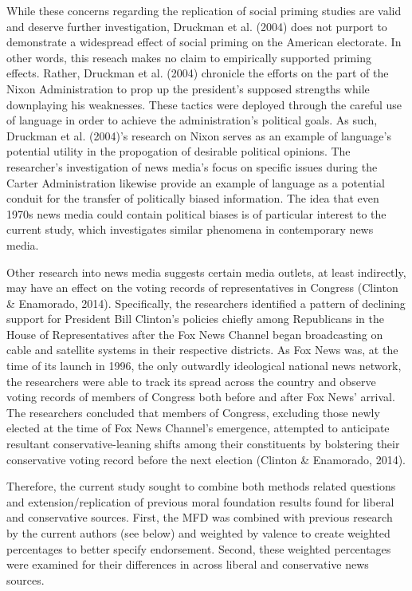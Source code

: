 \documentclass[english,,man]{apa6}
\begin{document}
While these concerns regarding the replication of social priming studies are valid and deserve further investigation, Druckman et al. (2004) does not purport to demonstrate a widespread effect of social priming on the American electorate. In other words, this reseach makes no claim to empirically supported priming effects. Rather, Druckman et al. (2004) chronicle the efforts on the part of the Nixon Administration to prop up the president's supposed strengths while downplaying his weaknesses. These tactics were deployed through the careful use of language in order to achieve the administration's political goals. As such, Druckman et al. (2004)'s research on Nixon serves as an example of language's potential utility in the propogation of desirable political opinions. The researcher's investigation of news media's focus on specific issues during the Carter Administration likewise provide an example of language as a potential conduit for the transfer of politically biased information. The idea that even 1970s news media could contain political biases is of particular interest to the current study, which investigates similar phenomena in contemporary news media.

Other research into news media suggests certain media outlets, at least indirectly, may have an effect on the voting records of representatives in Congress (Clinton \& Enamorado, 2014). Specifically, the researchers identified a pattern of declining support for President Bill Clinton's policies chiefly among Republicans in the House of Representatives after the Fox News Channel began broadcasting on cable and satellite systems in their respective districts. As Fox News was, at the time of its launch in 1996, the only outwardly ideological national news network, the researchers were able to track its spread across the country and observe voting records of members of Congress both before and after Fox News' arrival. The researchers concluded that members of Congress, excluding those newly elected at the time of Fox News Channel's emergence, attempted to anticipate resultant conservative-leaning shifts among their constituents by bolstering their conservative voting record before the next election (Clinton \& Enamorado, 2014).

Therefore, the current study sought to combine both methods related questions and extension/replication of previous moral foundation results found for liberal and conservative sources. First, the MFD was combined with previous research by the current authors (see below) and weighted by valence to create weighted percentages to better specify endorsement. Second, these weighted percentages were examined for their differences in across liberal and conservative news sources.
\end{document}
